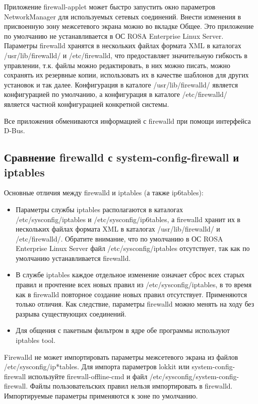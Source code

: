 \documentclass[a4paper,10pt,twoside]{article}
\begin{document}
Приложение firewall-applet может быстро запустить окно параметров NetworkManager для используемых сетевых соединений. Внести изменения в присвоенную зону межсетевого экрана можно во вкладке Общее. Это приложение по умолчанию не устанавливается в ОС ROSA Enterprise Linux Server. Параметры  firewalld хранятся в нескольких файлах формата XML в каталогах /usr/lib/firewalld/ и /etc/firewalld, что предоставляет значительную гибкость в управлении, т.к. файлы можно редактировать, в них можно писать, можно сохранять их резервные копии, использовать их в качестве шаблонов для других установок и так далее. Конфигурация в каталоге /usr/lib/firewalld/ является конфигурацией по умолчанию, а конфигурация в каталоге /etc/firewalld/ является частной конфигурацией конкретной системы.

Все приложения обмениваются информацией с firewalld при помощи интерфейса D-Bus.


\subsection{Сравнение firewalld с system-config-firewall и iptables}

Основные отличия между firewalld и iptables (а также ip6tables):

\begin{itemize}
\item Параметры службы iptables располагаются в каталогах /etc/sysconfig/iptables и /etc/sysconfig/ip6tables, а firewalld хранит их в нескольких файлах формата XML в каталогах /usr/lib/firewalld/ и /etc/firewalld/. Обратите внимание, что по умолчанию в ОС ROSA Enterprise Linux Server файл /etc/sysconfig/iptables отсутствует, так как по умолчанию устанавливается firewalld.

\item В службе iptables каждое отдельное изменение означает сброс всех старых правил и прочтение всех новых правил из /etc/sysconfig/iptables, в то время как в firewalld повторное создание новых правил отсутствует. Применяются только отличия. Как следствие, параметры firewalld можно менять на ходу без разрыва существующих соединений.

\item Для общения с пакетным фильтром в ядре обе программы используют iptables tool.
\end{itemize}


Firewalld не может импортировать  параметры межсетевого экрана из файлов /etc/sysconfig/ip*tables. Для импорта параметров lokkit или system-config-firewall используйте firewall-offline-cmd и файл /etc/sysconfig/system-config-firewall. Файлы пользовательских правил нельзя импортировать в firewalld. Импортируемые параметры применяются к зоне по умолчанию.
\end{document}
